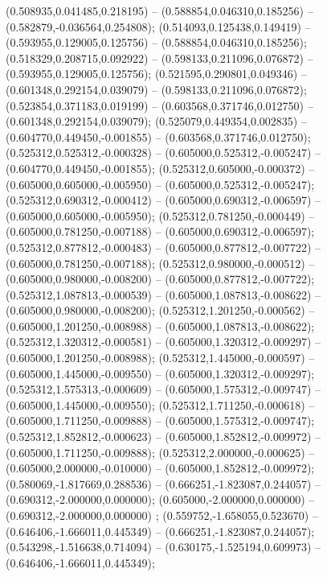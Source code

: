  (0.508935,0.041485,0.218195) -- (0.588854,0.046310,0.185256) -- (0.582879,-0.036564,0.254808);
 (0.514093,0.125438,0.149419) -- (0.593955,0.129005,0.125756) -- (0.588854,0.046310,0.185256);
 (0.518329,0.208715,0.092922) -- (0.598133,0.211096,0.076872) -- (0.593955,0.129005,0.125756);
 (0.521595,0.290801,0.049346) -- (0.601348,0.292154,0.039079) -- (0.598133,0.211096,0.076872);
 (0.523854,0.371183,0.019199) -- (0.603568,0.371746,0.012750) -- (0.601348,0.292154,0.039079);
 (0.525079,0.449354,0.002835) -- (0.604770,0.449450,-0.001855) -- (0.603568,0.371746,0.012750);
 (0.525312,0.525312,-0.000328) -- (0.605000,0.525312,-0.005247) -- (0.604770,0.449450,-0.001855);
 (0.525312,0.605000,-0.000372) -- (0.605000,0.605000,-0.005950) -- (0.605000,0.525312,-0.005247);
 (0.525312,0.690312,-0.000412) -- (0.605000,0.690312,-0.006597) -- (0.605000,0.605000,-0.005950);
 (0.525312,0.781250,-0.000449) -- (0.605000,0.781250,-0.007188) -- (0.605000,0.690312,-0.006597);
 (0.525312,0.877812,-0.000483) -- (0.605000,0.877812,-0.007722) -- (0.605000,0.781250,-0.007188);
 (0.525312,0.980000,-0.000512) -- (0.605000,0.980000,-0.008200) -- (0.605000,0.877812,-0.007722);
 (0.525312,1.087813,-0.000539) -- (0.605000,1.087813,-0.008622) -- (0.605000,0.980000,-0.008200);
 (0.525312,1.201250,-0.000562) -- (0.605000,1.201250,-0.008988) -- (0.605000,1.087813,-0.008622);
 (0.525312,1.320312,-0.000581) -- (0.605000,1.320312,-0.009297) -- (0.605000,1.201250,-0.008988);
 (0.525312,1.445000,-0.000597) -- (0.605000,1.445000,-0.009550) -- (0.605000,1.320312,-0.009297);
 (0.525312,1.575313,-0.000609) -- (0.605000,1.575312,-0.009747) -- (0.605000,1.445000,-0.009550);
 (0.525312,1.711250,-0.000618) -- (0.605000,1.711250,-0.009888) -- (0.605000,1.575312,-0.009747);
 (0.525312,1.852812,-0.000623) -- (0.605000,1.852812,-0.009972) -- (0.605000,1.711250,-0.009888);
 (0.525312,2.000000,-0.000625) -- (0.605000,2.000000,-0.010000) -- (0.605000,1.852812,-0.009972);
 (0.580069,-1.817669,0.288536) -- (0.666251,-1.823087,0.244057) -- (0.690312,-2.000000,0.000000);
 (0.605000,-2.000000,0.000000) -- (0.690312,-2.000000,0.000000) ;
 (0.559752,-1.658055,0.523670) -- (0.646406,-1.666011,0.445349) -- (0.666251,-1.823087,0.244057);
 (0.543298,-1.516638,0.714094) -- (0.630175,-1.525194,0.609973) -- (0.646406,-1.666011,0.445349);

